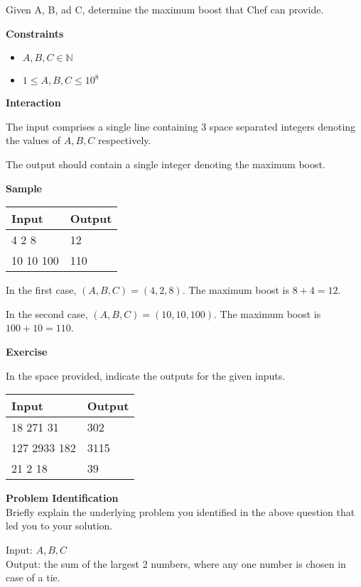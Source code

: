 \documentclass[a4paper]{exam}
\newcommand\heading[1]{\textbf{#1}}
\newcommand\inn{\in \mathbb{N}}
\begin{document}
\begin{questions}
      Given A, B, ad C, determine the maximum boost that Chef can provide.

    \heading{Constraints}
    \begin{itemize}
        \item $A,B,C \inn$
        \item $1 \le A,B,C \le 10^8$
    \end{itemize}

    \heading{Interaction}

    The input comprises a single line containing 3 space separated integers denoting the values of  $A,B,C$ respectively.

    The output should contain a single integer denoting the maximum boost.

    \heading{Sample}

    \begin{tabularx}{\textwidth}{|X|X|}
        \rowcolor{gray!50}
        \hline
        Input     & Output \\ \hline\hline
        4 2 8     & 12     \\\hline
        10 10 100 & 110    \\\hline
    \end{tabularx}

    In the first case, $(A,B,C)=(4,2,8)$. The maximum boost is $8+4=12$.
    
    In the second case, $(A,B,C)=(10,10,100)$. The maximum boost is $100+10=110$.

    \heading{Exercise}

    In the space provided, indicate the outputs for the given inputs.

    \begin{tabularx}{\textwidth}{|X|X|}
        \rowcolor{gray!50}
        \hline
        Input        & Output \\ \hline\hline
        18 271 31    & 302    \\\hline
        127 2933 182 & 3115   \\\hline
        21 2 18      & 39     \\\hline
    \end{tabularx}

    \heading{Problem Identification}\\
    Briefly explain the underlying problem you identified in the above question that led you to your solution.

    \begin{mdframed}
        Input: $A,B,C$ \\
        Output: the sum of the largest 2 numbers, where any one number is chosen in case of a tie.
    \end{mdframed}


\end{questions}
\end{document}
